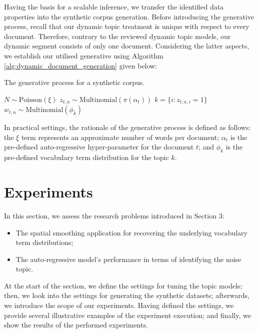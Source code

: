 \documentclass{mpaper}
\begin{document}
\par Having the basis for a scalable inference, we transfer the identified data properties into the synthetic corpus generation. Before introducing the generative process, recall that our dynamic topic treatment is unique with respect to every document. Therefore, contrary to the reviewed dynamic topic models, our dynamic segment consists of only one document. Considering the latter aspects, we establish our utilised generative using Algorithm \ref{alg:dynamic_document_generation} given below:
\begin{algorithm}[H]
\caption{The generative process for a synthetic corpus.}
\label{alg:dynamic_document_generation}
\begin{algorithmic}[2]
\State $N \sim \mbox{Poisson}(\xi)$
\State $z_{t, n} \sim \mbox{Multinomial}(\pi(\alpha_t))$
\State $k = \{i : z_{t, n, i} = 1\}$
\State $w_{t, n} \sim \mbox{Multinomial}(\phi_k)$
\EndFor
\EndFor
\end{algorithmic}
\end{algorithm}
In practical settings, the rationale of the generative process is defined as follows: the $\xi$ term represents an approximate number of words per document; $\alpha_t$ is the pre-defined auto-regressive hyper-parameter for the document $t$; and $\phi_k$ is the pre-defined vocabulary term distribution for the topic $k$.
 \section{Experiments}

\par In this section, we assess the research problems introduced in Section 3:
\begin{itemize}
	\item The spatial smoothing application for recovering the underlying vocabulary term distributions;
	\item The auto-regressive model's performance in terms of identifying the noise topic.
\end{itemize}
At the start of the section, we define the settings for tuning the topic models; then, we look into the settings for generating the synthetic datasets; afterwards, we introduce the scope of our experiments. Having defined the settings, we provide several illustrative examples of the experiment execution; and finally, we show the results of the performed experiments.
\end{document}
